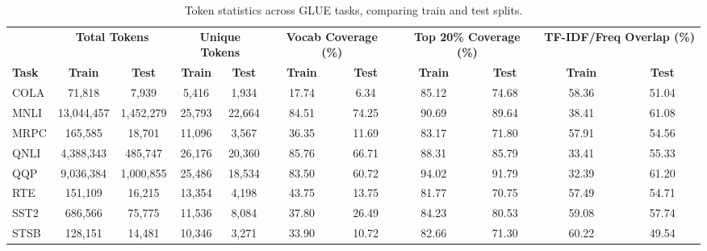 \documentclass[twocolumn]{article}
\begin{document}
\begin{table}[htbp]
\centering
\scriptsize
\setlength{\tabcolsep}{3.5pt}
\begin{tabular}{l|cc|cc|cc|cc|cc}
\toprule
& \multicolumn{2}{c|}{\textbf{Total Tokens}} & \multicolumn{2}{c|}{\textbf{Unique Tokens}} & \multicolumn{2}{c|}{\textbf{Vocab Coverage (\%)}} & \multicolumn{2}{c|}{\textbf{Top 20\% Coverage (\%)}} & \multicolumn{2}{c}{\textbf{TF-IDF/Freq Overlap (\%)}} \\
\textbf{Task} & \textbf{Train} & \textbf{Test} & \textbf{Train} & \textbf{Test} & \textbf{Train} & \textbf{Test} & \textbf{Train} & \textbf{Test} & \textbf{Train} & \textbf{Test} \\
\midrule
COLA & 71,818 & 7,939 & 5,416 & 1,934 & 17.74 & 6.34 & 85.12 & 74.68 & 58.36 & 51.04 \\
MNLI & 13,044,457 & 1,452,279 & 25,793 & 22,664 & 84.51 & 74.25 & 90.69 & 89.64 & 38.41 & 61.08 \\
MRPC & 165,585 & 18,701 & 11,096 & 3,567 & 36.35 & 11.69 & 83.17 & 71.80 & 57.91 & 54.56 \\
QNLI & 4,388,343 & 485,747 & 26,176 & 20,360 & 85.76 & 66.71 & 88.31 & 85.79 & 33.41 & 55.33 \\
QQP & 9,036,384 & 1,000,855 & 25,486 & 18,534 & 83.50 & 60.72 & 94.02 & 91.79 & 32.39 & 61.20 \\
RTE & 151,109 & 16,215 & 13,354 & 4,198 & 43.75 & 13.75 & 81.77 & 70.75 & 57.49 & 54.71 \\
SST2 & 686,566 & 75,775 & 11,536 & 8,084 & 37.80 & 26.49 & 84.23 & 80.53 & 59.08 & 57.74 \\
STSB & 128,151 & 14,481 & 10,346 & 3,271 & 33.90 & 10.72 & 82.66 & 71.30 & 60.22 & 49.54 \\
\bottomrule
\end{tabular}
\caption{Token statistics across GLUE tasks, comparing train and test splits.}
\label{tab:token_statistics}
\end{table}
\end{document}

